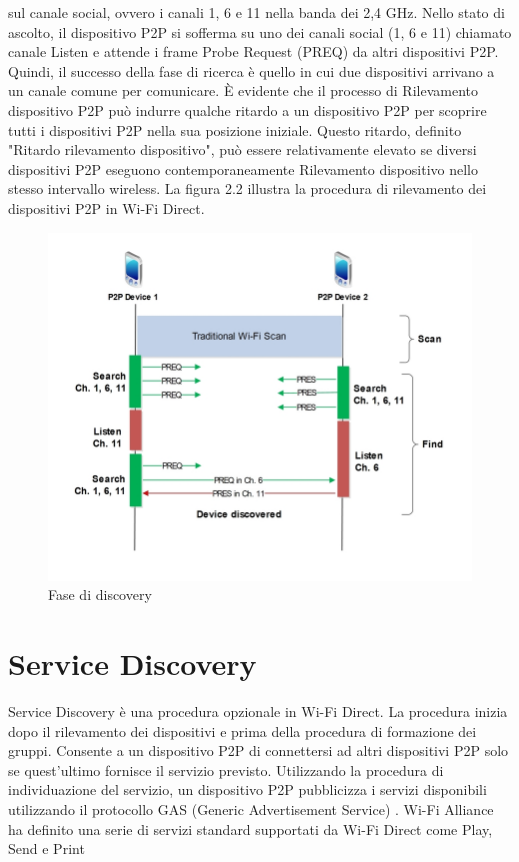 sul canale social, ovvero i canali 1, 6 e 11 nella banda dei 2,4 GHz.
Nello stato di ascolto, il dispositivo P2P si sofferma su uno dei canali
social (1, 6 e 11) chiamato canale Listen e attende i frame Probe Request
(PREQ) da altri dispositivi P2P. Quindi, il successo della fase di ricerca
è quello in cui due dispositivi arrivano a un canale comune per comunicare.
È evidente che il processo di Rilevamento dispositivo P2P può indurre
qualche ritardo a un dispositivo P2P per scoprire tutti i
dispositivi P2P nella sua posizione iniziale. Questo ritardo, definito
"Ritardo rilevamento dispositivo", può essere relativamente elevato se
diversi dispositivi P2P eseguono contemporaneamente Rilevamento dispositivo
nello stesso intervallo wireless. La figura 2.2 illustra la procedura di
rilevamento dei dispositivi P2P in Wi-Fi Direct.

\begin{figure}
\caption{Fase di discovery}
\includegraphics[width=1\columnwidth]{imgs/DeviceDiscovery.jpg} %
\end{figure}


\section{Service Discovery}
Service Discovery è una
procedura opzionale in Wi-Fi Direct. La procedura inizia dopo il
rilevamento dei dispositivi e prima della procedura di formazione dei
gruppi. Consente a un dispositivo P2P di connettersi ad altri dispositivi
P2P solo se quest'ultimo fornisce il servizio previsto. Utilizzando la
procedura di individuazione del servizio, un dispositivo P2P pubblicizza
i servizi disponibili utilizzando il protocollo GAS
(Generic Advertisement Service) \cite{wikipedia_2015}.
Wi-Fi Alliance ha definito una serie di servizi standard supportati
da Wi-Fi Direct come Play, Send e Print \cite{wi-fialliance}





